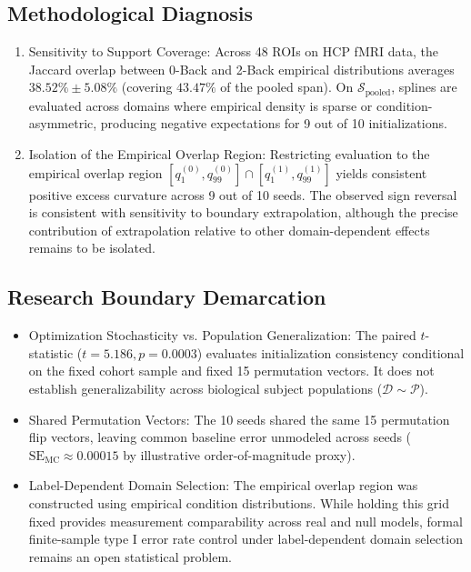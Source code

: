 \documentclass[11pt,a4paper]{article}
\begin{document}
\subsection{Methodological Diagnosis}
\begin{enumerate}
    \item Sensitivity to Support Coverage: Across 48 ROIs on HCP fMRI data, the Jaccard overlap between 0-Back and 2-Back empirical distributions averages $38.52\% \pm 5.08\%$ (covering $43.47\%$ of the pooled span). On $\mathcal{S}_{\mathrm{pooled}}$, splines are evaluated across domains where empirical density is sparse or condition-asymmetric, producing negative expectations for 9 out of 10 initializations.
    \item Isolation of the Empirical Overlap Region: Restricting evaluation to the empirical overlap region $[q_1^{(0)}, q_{99}^{(0)}] \cap [q_1^{(1)}, q_{99}^{(1)}]$ yields consistent positive excess curvature across 9 out of 10 seeds. The observed sign reversal is consistent with sensitivity to boundary extrapolation, although the precise contribution of extrapolation relative to other domain-dependent effects remains to be isolated.
\end{enumerate}

\subsection{Research Boundary Demarcation}
\begin{itemize}
    \item Optimization Stochasticity vs. Population Generalization: The paired $t$-statistic ($t = 5.186, p = 0.0003$) evaluates initialization consistency conditional on the fixed cohort sample and fixed 15 permutation vectors. It does not establish generalizability across biological subject populations ($\mathcal{D} \sim \mathcal{P}$).
    \item Shared Permutation Vectors: The 10 seeds shared the same 15 permutation flip vectors, leaving common baseline error unmodeled across seeds ($\mathrm{SE}_{\mathrm{MC}} \approx 0.00015$ by illustrative order-of-magnitude proxy).
    \item Label-Dependent Domain Selection: The empirical overlap region was constructed using empirical condition distributions. While holding this grid fixed provides measurement comparability across real and null models, formal finite-sample type I error rate control under label-dependent domain selection remains an open statistical problem.
\end{itemize}
\end{document}
